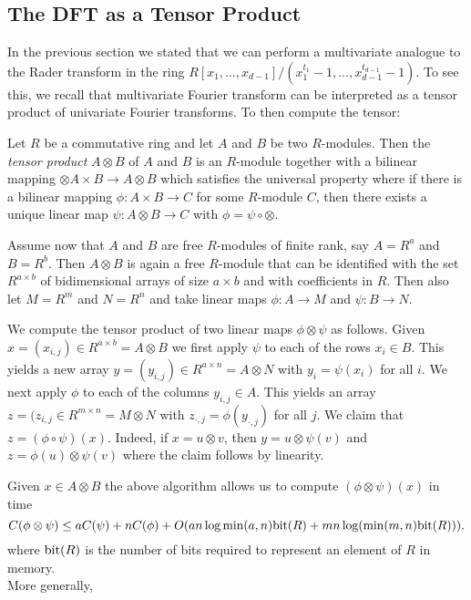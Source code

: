 \subsection{The DFT as a Tensor Product}%
\label{sub:the_dft_as_a_tensor_product}

In the previous section we stated that we can perform a multivariate analogue to the Rader transform in the ring $R[x_1, \ldots, x_{d-1}] / (x_1^{t_1} - 1, \ldots, x_{d-1}^{t_{d-1}} - 1)$. To see this, we recall that multivariate Fourier transform can be interpreted as a tensor product of univariate Fourier transforms. To then compute the tensor:

Let $R$ be a commutative ring and let $A$ and $B$ be two $R$-modules. Then the \emph{tensor product} $A \otimes B$ of $A$ and $B$ is an $R$-module together with a bilinear mapping $\otimes A \times B \to A \otimes B$ which satisfies the universal property where if there is a bilinear mapping $\phi: A \times B \to C$ for some $R$-module $C$, then there exists a unique linear map $\psi: A \otimes B \to C$ with $\phi = \psi \circ \otimes$.

Assume now that $A$ and $B$ are free $R$-modules of finite rank, say $A = R^a$ and $B = R^b$. Then $A \otimes B$ is again a free $R$-module that can be identified with the set $R^{a \times b}$ of bidimensional arrays of size $a \times b$ and with coefficients in $R$. Then also let $M = R^m$ and $N = R^n$ and take linear maps $\phi: A \to M$ and $\psi : B \to N$.

We compute the tensor product of two linear maps $\phi \otimes \psi$ as follows. Given $x = (x_{i,j}) \in R^{a \times b} = A \otimes B$ we first apply $\psi$ to each of the rows $x_i \in B$. This yields a new array $y = (y_{i, j}) \in R^{a \times n} = A \otimes N$ with $y_i = \psi(x_i)$ for all $i$. We next apply $\phi$ to each of the columns $y_{i, j} \in A$. This yields an array $z = (z_{i, j} \in R^{m \times n} = M \otimes N$ with $z_{\cdot , j} = \phi(y_{\cdot, j})$ for all $j$. We claim that $z = (\phi \circ \psi)(x)$. Indeed, if $x = u \otimes v$, then $y = u \otimes \psi(v)$ and $z = \phi(u) \otimes \psi(v)$ where the claim follows by linearity.

Given $x \in A \otimes B$ the above algorithm allows us to compute $(\phi \otimes \psi) (x)$ in time
\[
    C(\phi \otimes \psi) \leq aC(\psi) + nC(\phi) + O(a n \log \min(a, n) \textrm{bit}(R) + m n \log( \min (m, n)\textrm{bit}(R))).
\]
where $\textrm{bit}(R)$ is the number of bits required to represent an element of $R$ in memory.\\
More generally,

